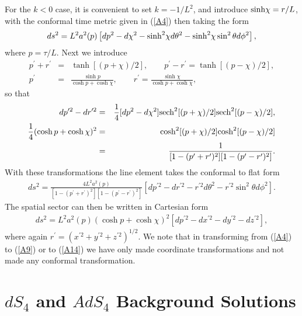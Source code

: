 For the $k<0$ case, it is convenient to set $k=-1/L^2$, and introduce ${\rm sinh} \chi=r/L$, with the conformal time metric given in (\ref{A4}) then taking the form
%
\begin{eqnarray}
ds^2=L^2a^2(p)\left[dp^2-d\chi^2 -{\rm sinh}^2\chi d\theta^2-{\rm sinh}^2\chi \sin^2\theta d\phi^2\right],
\label{A10}
\end{eqnarray}
%
where $p=\tau/L$. Next we introduce
%
\begin{eqnarray}
p^{\prime}+r^{\prime}&=&\tanh[(p+\chi)/2],\qquad p^{\prime}-r^{\prime}=\tanh[(p-\chi)/2],
\nonumber\\
 p^{\prime}&=&\frac{\sinh p}{\cosh p+\cosh \chi},\qquad r^{\prime}=\frac{\sinh \chi}{\cosh p+\cosh \chi},
\label{A11}
\end{eqnarray}
%
so that
%
\begin{eqnarray}
dp^{\prime 2}-dr^{\prime 2}&=&\frac{1}{4}[dp^2-d\chi^2]{\rm sech}^2[(p+\chi)/2]{\rm sech}^2[(p-\chi)/2],
\nonumber\\
\frac{1}{4}(\cosh p+\cosh \chi)^2&=&{\rm \cosh}^2[(p+\chi)/2]{\rm \cosh}^2[(p-\chi)/2]
\nonumber\\
&=&\frac{1}{[1-(p^{\prime}+r^{\prime})^2][1-(p^{\prime}-r^{\prime})^2]}.
\label{A12}
\end{eqnarray}
%
With these transformations the line element takes the conformal to flat form
%
\begin{eqnarray}
ds^2=\frac{4L^2a^2(p)}{[1-(p^{\prime}+r^{\prime})^2][1-(p^{\prime}-r^{\prime})^2]}\left[dp^{\prime 2}-dr^{\prime 2} -r^{\prime 2}d\theta^2-r^{\prime 2} \sin^2\theta d\phi^2\right].
\label{A13}
\end{eqnarray}
%
The spatial sector can then be written in Cartesian form
%
\begin{eqnarray}
ds^2=L^2a^2(p)(\cosh p+\cosh \chi)^2\left[dp^{\prime 2}-dx^{\prime 2} -dy^{\prime 2} -dz^{\prime 2}\right],
\label{A14}
\end{eqnarray}
%
where again $r^{\prime}=(x^{\prime 2}+ y^{\prime 2}+z^{\prime 2})^{1/2}$.  We note that in transforming from (\ref{A4}) to (\ref{A9}) or to (\ref{A14}) we have only made coordinate transformations and not made any conformal transformation. 

\section{$dS_4$ and $AdS_4$ Background Solutions}
\label{abs:ds4}


